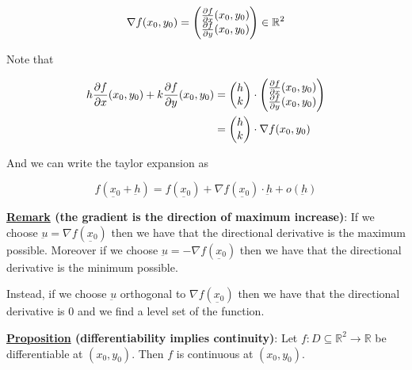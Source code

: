 \documentclass[10pt]{extarticle}
\newcommand{\R}{\mathbb{R}}
\newcommand{\munderbar}[1]{\underbar{\ensuremath{#1}}}
\begin{document}
$$
    \nabla f(x_0, y_0) = \begin{pmatrix}
        \pdv{f}{x}()(x_0, y_0) \\ \pdv{f}{y}()(x_0, y_0)
    \end{pmatrix} \in \R^2
$$

Note that

\begin{align*}
    h \pdv{f}{x}()(x_0, y_0) + k \pdv{f}{y}()(x_0, y_0) & = \begin{pmatrix}
                                                                h \\ k
                                                            \end{pmatrix} \cdot \begin{pmatrix}
                                                                                    \pdv{f}{x}()(x_0, y_0) \\ \pdv{f}{y}()(x_0, y_0)
                                                                                \end{pmatrix} \\
                                                        & = \begin{pmatrix}
                                                                h \\ k
                                                            \end{pmatrix} \cdot \nabla f(x_0, y_0)
\end{align*}

And we can write the taylor expansion as

$$
    f(\munderbar{x_0} + \munderbar{h}) = f(\munderbar{x_0}) + \nabla f(\munderbar{x_0}) \cdot \munderbar{h} + o(\munderbar{h})
$$

\textbf{\underline{Remark} (the gradient is the direction of maximum increase)}:
If we choose $\munderbar{u} = \nabla f(\munderbar{x_0})$ then we have that the directional derivative is the maximum possible.
Moreover if we choose $\munderbar{u} = -\nabla f(\munderbar{x_0})$ then we have that the directional derivative is the minimum possible.

Instead, if we choose $\munderbar{u}$ orthogonal to $\nabla f(\munderbar{x_0})$ then we have that the directional derivative is 0 and we find a level set of the function.

\textbf{\underline{Proposition} (differentiability implies continuity)}:
Let $f: D \subseteq \R^2 \to \R$ be differentiable at $(x_0, y_0)$.
Then $f$ is continuous at $(x_0, y_0)$.
\end{document}
